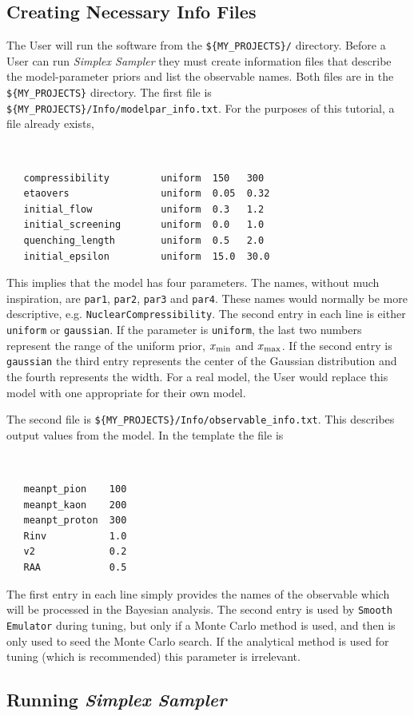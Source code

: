 \documentclass[UserManual.tex]{subfiles}
\begin{document}
\subsection{Creating Necessary Info Files}
The User will run the software from the {\tt \$\{MY\_PROJECTS\}/} directory. Before a User can run {\it Simplex Sampler} they must create information files that describe the model-parameter priors and list the observable names. Both files are in the {\tt \$\{MY\_PROJECTS\}} directory. The first file is {\tt \$\{MY\_PROJECTS\}/Info/modelpar\_info.txt}. For the purposes of this tutorial, a file already exists,
{\tt
\begin{verbatim}
   compressibility         uniform  150   300
   etaovers                uniform  0.05  0.32
   initial_flow            uniform  0.3   1.2
   initial_screening       uniform  0.0   1.0
   quenching_length        uniform  0.5   2.0
   initial_epsilon         uniform  15.0  30.0
\end{verbatim}
}
This implies that the model has four parameters. The names, without much inspiration, are {\tt par1}, {\tt par2}, {\tt par3} and {\tt par4}. These names would normally be more descriptive, e.g. {\tt NuclearCompressibility}. The second entry in each line is either {\tt uniform} or {\tt gaussian}. If the parameter is {\tt uniform}, the last two numbers represent the range of the uniform prior, $x_{\rm min}$ and $x_{\rm max}$. If the second entry is {\tt gaussian} the third entry represents the center of the Gaussian distribution and the fourth represents the width. For a real model, the User would replace this model with one appropriate for their own model.

The second file is {\tt \$\{MY\_PROJECTS\}/Info/observable\_info.txt}. This describes output values from the model. In the template the file is
{\tt
\begin{verbatim}
   meanpt_pion    100      
   meanpt_kaon    200      
   meanpt_proton  300      
   Rinv           1.0      
   v2             0.2     
   RAA            0.5
\end{verbatim}
}
The first entry in each line simply provides the names of the observable which will be processed in the Bayesian analysis.  The second entry is used by {\tt Smooth Emulator} during tuning, but only if a Monte Carlo method is used, and then is only used to seed the Monte Carlo search. If the analytical method is used for tuning (which is recommended) this parameter is irrelevant.

\subsection{Running {\it Simplex Sampler}}
\end{document}
